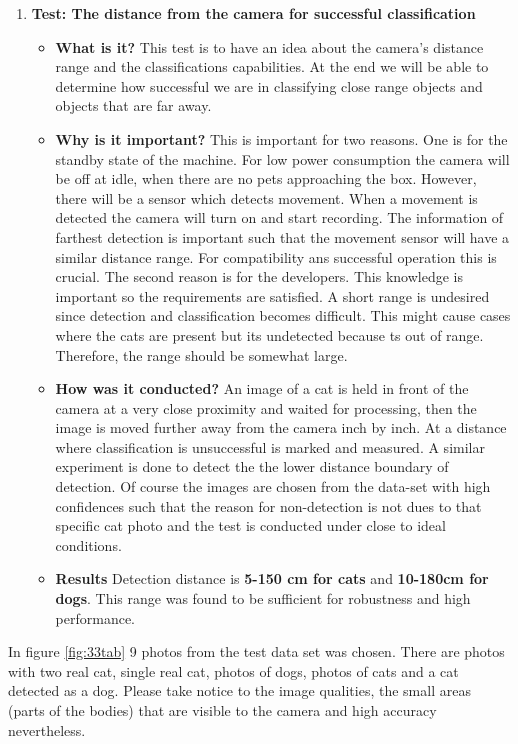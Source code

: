 \begin{enumerate}
\item \textbf{Test: The distance from the camera for successful classification} 

\begin{itemize}
    \item \textbf{What is it?} This test is to have an idea about the camera's distance range and the classifications capabilities. At the end we will be able to determine how successful we are in classifying close range objects and objects that are far away. 
    \item \textbf{Why is it important?} This is important for two reasons. One is for the standby state of the machine. For low power consumption the camera will be off at idle, when there are no pets approaching the box. However, there will be a sensor which detects movement. When a movement is detected the camera will turn on and start recording. The information of farthest detection is important such that the movement sensor will have a similar distance range. For compatibility ans successful operation this is crucial. The second reason is for the developers. This knowledge is important so the requirements are satisfied. A short range is undesired since detection and classification becomes difficult. This might cause cases where the cats are present but its undetected because ts out of range. Therefore, the range should be somewhat large.   
    \item \textbf{How was it conducted?} An image of a cat is held in front of the camera at a very close proximity and waited for processing, then the image is moved further away from the camera inch by inch. At a distance where classification is unsuccessful is marked and measured. A similar experiment is done to detect the the lower distance boundary of detection. Of course the images are chosen from the data-set with high confidences such that the reason for non-detection is not dues to that specific cat photo and the test is conducted under close to ideal conditions.
    \item \textbf{Results} Detection distance is \textbf{5-150 cm for cats} and \textbf{10-180cm for dogs}. This range was found to be sufficient for robustness and high performance. 
\end{itemize}
\end{enumerate}

In figure \ref{fig:33tab} 9 photos from the test data set was chosen. There are photos with two real cat, single real cat, photos of dogs, photos of cats and a cat detected as a dog. Please take notice to the image qualities, the small areas (parts of the bodies) that are visible to the camera and high accuracy nevertheless. 



